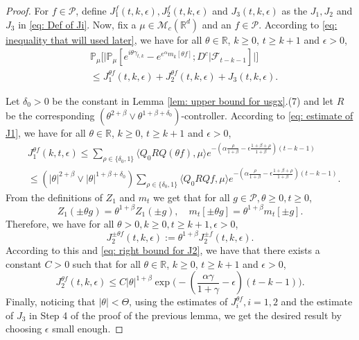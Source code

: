 \documentclass[12pt,a4paper]{amsart}
\theoremstyle{plain}
\theoremstyle{definition}
\numberwithin{equation}{section}
\begin{document}
\begin{proof}
	For  $f\in \mathcal P$, define $J_1^f(t,k,\epsilon), J_2^f(t,k,\epsilon)$ and $J_3(t,k,\epsilon)$ as the $J_1, J_2$ and $J_3$ in \eqref{eq: Def of Ji}.
	Now, fix a $\mu \in \mathcal M_c(\mathbb R^d)$ and an $f\in \mathcal P$.
    According to \eqref{eq: inequality that will used later},  we have for all $\theta\in \mathbb R$, $k\geq 0$, $t\geq k+1$ and $\epsilon> 0$,
\begin{align}
    &\mathbb{P}_{\mu}\Big[\big| \mathbb{P}_{\mu}[e^{i\theta \gamma_{t,k}}-e^{e^{\alpha}m_k[\theta f]}; D^c | \mathscr F_{t-k-1}]\big|\Big]
    \\&\leq J^{\theta f}_1(t,k,\epsilon) + J^{\theta f}_2(t,k,\epsilon)+J_3(t,k,\epsilon).
\end{align}

    Let $\delta_0 >0$ be the constant in Lemma \ref{lem: upper bound for usgx}.(7) and let $R$ be the corresponding $(\theta^{2+\beta}\vee \theta^{1+\beta+\delta_0})$-controller.
	According to \eqref{eq: estimate of J1}, we have for all $\theta\in \mathbb R$, $k\geq 0$, $t\geq k+1$ and $\epsilon> 0$,
\begin{align}
    &J^{\theta f}_1(k,t,\epsilon)
    \leq \sum_{\rho \in \{\delta_0,1\}} \langle Q_0 RQ(\theta f), \mu \rangle e^{-(\alpha\frac{\rho}{1+\beta}-\epsilon\frac{1+\beta+\rho}{1+\beta})(t-k-1)}
    \\& \leq(|\theta|^{2+\beta}\vee |\theta|^{1+\beta+\delta_0}) \sum_{\rho \in \{\delta_0,1\}} \langle Q_0 RQf, \mu \rangle e^{-(\alpha\frac{\rho}{1+\beta}-\epsilon\frac{1+\beta+\rho}{1+\beta})(t-k-1)}.
\end{align}
	From the definitions of $Z_1$ and $m_t$ we get that for all $g\in \mathcal P, \theta \geq 0, t\geq 0$,
\[
	Z_1( \pm \theta g) = \theta^{1+\beta} Z_1(\pm g), \quad m_t[\pm \theta g] = \theta^{1+\beta} m_t[\pm g].
\]
	Therefore, we have for all $\theta >0, k \geq 0, t\geq k+1, \epsilon > 0$,
\[
    J^{\pm \theta f}_2(t,k,\epsilon)
	:= \theta^{1+\beta} J_2^{\pm f}(t,k,\epsilon).
\]
	According to this and \eqref{eq: right bound for J2},
	we have that there exists a constant $C > 0$ such that for all $\theta\in \mathbb R$, $k\geq 0$, $t\geq k+1$ and $\epsilon> 0$,
\begin{equation}
\label{eq:31step3b}
    J^{\theta f}_2(t,k,\epsilon)
    \leq C |\theta|^{1+\beta}\exp\Big(-(\frac{\alpha\gamma}{1+\gamma}-\epsilon)(t-k-1)\Big).
\end{equation}
	Finally, noticing that $|\theta| < \Theta$, using the estimates of $J^{\theta f}_{i}, i = 1,2$ and the estimate of $J_3$ in Step 4 of the proof of the previous lemma, we get the desired result by choosing $\epsilon$ small enough.
\end{proof}
\end{document}
